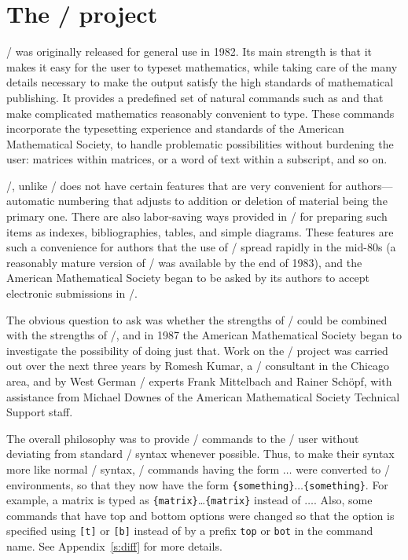 \section{The \amslatex/ project}

\amstex/ was originally released for general use in 1982.  Its main
strength is that it makes it easy for the user to typeset mathematics,
while taking care of the many details necessary to make the output
satisfy the high standards of mathematical publishing.  It provides a
predefined set of natural commands such as  and  that
make complicated mathematics reasonably convenient to type.  These
commands incorporate the typesetting experience and standards of the
American Mathematical Society, to handle
problematic possibilities without burdening the user: matrices within matrices,
or a word of text within a subscript, and so on.

\amstex/, unlike \latex/ does not have certain features that are
very convenient for authors---automatic numbering that adjusts to
addition or deletion of material being the primary one.  There are
also labor-saving ways provided in \latex/ for preparing such items as indexes,
bibliographies, tables, and simple diagrams.  These
features are such a convenience for authors that the use of \latex/
spread rapidly in the mid-80s (a
reasonably mature version of \latex/ was available by the end of
1983), and the American Mathematical Society began to be asked by its
authors to accept electronic submissions in \latex/.

The obvious question to ask was whether the strengths of \amstex/ could
be combined with the strengths of \latex/, and in 1987 the American
Mathematical Society began to investigate the possibility of doing just
that.  Work on the \amslatex/ project was carried out over
the next three years by Romesh Kumar, a \tex/
consultant in the Chicago area, and by West German \latex/ experts Frank
Mittelbach and Rainer Sch\"opf, with assistance from Michael Downes
of the American Mathematical Society Technical Support staff.

The overall philosophy was to provide \amstex/ commands to the \latex/ user
without deviating from standard \latex/ syntax whenever possible.
Thus, to make their syntax more like normal \latex/ syntax, \amstex/
commands having the form \5$\ldots$\5 were
converted to \latex/ environments, so that they now have the form
\verb"{something}"\5$\ldots$\5\verb"{something}".  For
example, a matrix is typed as
\verb"{matrix}"\5\dots\5\verb"{matrix}" instead of
\5$\ldots$\5.  Also, some commands that have top
and bottom options were changed so that the option is specified using
\verb"[t]" or \verb"[b]" instead of by a prefix \verb"top" or \verb"bot"
in the command name.  See Appendix~\ref{s:diff} for more details.

